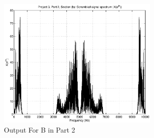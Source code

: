 
\begin{figure}[!htbp]
  \centering
    \includegraphics[width=0.7\textwidth]{Part2/Output/Figures/Part2B.eps}
  \caption{Output For B in Part 2}
\end{figure}
